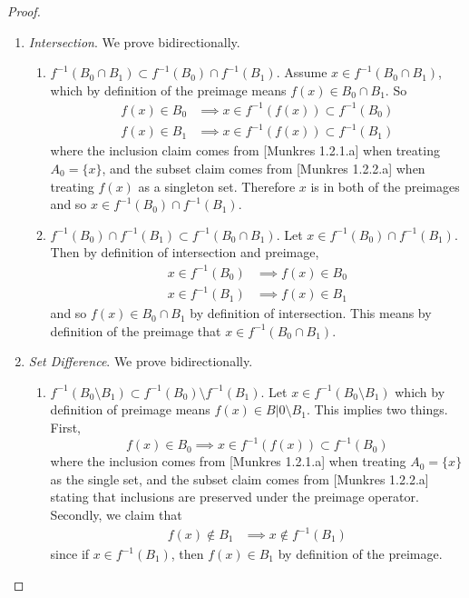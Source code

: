 \begin{proof}
\begin{enumerate}
      \item \textit{Intersection}. We prove bidirectionally. 
      \begin{enumerate}
        \item $f^{-1} (B_0 \cap B_1) \subset f^{-1} (B_0) \cap f^{-1} (B_1)$. Assume $x \in f^{-1} (B_0 \cap B_1)$, which by definition of the preimage means $f(x) \in B_0 \cap B_1$. So 
          \begin{align}
            f(x) \in B_0 & \implies x \in f^{-1} (f(x)) \subset f^{-1} (B_0) \\
            f(x) \in B_1 & \implies x \in f^{-1} (f(x)) \subset f^{-1} (B_1)
          \end{align}
          where the inclusion claim comes from [Munkres 1.2.1.a] when treating $A_0 = \{x\}$, and the subset claim comes from [Munkres 1.2.2.a] when treating $f(x)$ as a singleton set. Therefore $x$ is in both of the preimages and so $x \in f^{-1} (B_0) \cap f^{-1} (B_1)$. 
        \item $f^{-1} (B_0) \cap f^{-1} (B_1) \subset f^{-1} (B_0 \cap B_1)$. Let $x \in f^{-1} (B_0) \cap f^{-1} (B_1)$. Then by definition of intersection and preimage, 
          \begin{align}
            x \in f^{-1} (B_0) & \implies f(x) \in B_0 \\
            x \in f^{-1} (B_1) & \implies f(x) \in B_1 
          \end{align} 
          and so $f(x) \in B_0 \cap B_1$ by definition of intersection. This means by definition of the preimage that $x \in f^{-1}(B_0 \cap B_1)$. 
      \end{enumerate}

      \item \textit{Set Difference}. We prove bidirectionally. 
      \begin{enumerate}
        \item $f^{-1} (B_0 \setminus B_1) \subset f^{-1} (B_0) \setminus f^{-1} (B_1)$. Let $x \in f^{-1}(B_0 \setminus B_1)$ which by definition of preimage means $f(x) \in B|0 \setminus B_1$. This implies two things. First, 
          \begin{equation}
            f(x) \in B_0 \implies x \in f^{-1} (f(x)) \subset f^{-1} (B_0)
          \end{equation}
          where the inclusion comes from [Munkres 1.2.1.a] when treating $A_0 = \{x\}$ as the single set, and the subset claim comes from [Munkres 1.2.2.a] stating that inclusions are preserved under the preimage operator. Secondly, we claim that  
          \begin{align}
            f(x) \not\in B_1 & \implies x \not\in f^{-1} (B_1)
          \end{align}
          since if $x \in f^{-1} (B_1)$, then $f(x) \in B_1$ by definition of the preimage. 


\end{enumerate}
\end{enumerate}
\end{proof}
